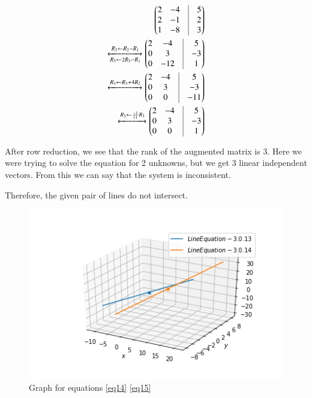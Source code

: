\documentclass[journal,12pt,twocolumn]{IEEEtran}
\begin{document}
\begin{enumerate}
\begin{align}
	\myvec{
		2 & -4 & \vrule & 5 \\
		2 & -1 & \vrule & 2 \\
		1 & -8 & \vrule & 3 \\
	}
	\\
	\xleftrightarrow[R_3 \leftarrow 2R_3-R_1]{R_2 \leftarrow R_2-R_1}
	\myvec{
		2 & -4 & \vrule & 5 \\
		0 & 3 & \vrule & -3 \\
		0 & -12 & \vrule & 1 \\
	}
	\\
	\xleftrightarrow[]{R_3 \leftarrow R_3+4R_2}
	\myvec{
		2 & -4 & \vrule & 5 \\
		0 & 3 & \vrule & -3 \\
		0 & 0 & \vrule & -11 \\
	}
	\\
	\xleftrightarrow[]{R_3 \leftarrow \frac{-1}{11}R_3}
	\myvec{
		2 & -4 & \vrule & 5 \\
		0 & 3 & \vrule & -3 \\
		0 & 0 & \vrule & 1 \\
	}
\end{align}

After row reduction, we see that the rank of the augmented matrix is 3. Here we were trying to solve the equation for 2 unknowns, but we get 3 linear independent vectors. From this we can say that the system is inconsistent.

Therefore, the given pair of lines do not intersect.

\begin{figure}
	\centering
	\includegraphics[width=\columnwidth]{./codes/figs/Line_interest_2.png}
	\caption{Graph for equations \ref{eq14} \ref{eq15}}
	\label{fig:line_equation_2}
\end{figure}
\end{enumerate}

    
\end{document}
